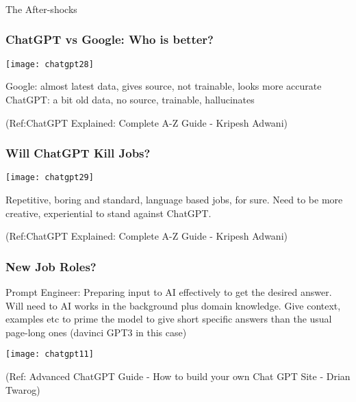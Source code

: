 \begin{frame}[fragile]\frametitle{}
\begin{center}
{\Large The After-shocks}
\end{center}
\end{frame}



\begin{frame}[fragile]\frametitle{ChatGPT vs Google: Who is better?}


\begin{center}
\texttt{[image: chatgpt28]}
\end{center}		

Google: almost latest data, gives source, not trainable, looks more accurate
ChatGPT: a bit old data, no source, trainable, hallucinates

\tiny{(Ref:ChatGPT Explained: Complete A-Z Guide - Kripesh Adwani)}
\end{frame}


\begin{frame}[fragile]\frametitle{Will ChatGPT Kill Jobs?}


\begin{center}
\texttt{[image: chatgpt29]}
\end{center}		

Repetitive, boring and standard, language based jobs, for sure.
Need to be more creative, experiential to stand against ChatGPT.

\tiny{(Ref:ChatGPT Explained: Complete A-Z Guide - Kripesh Adwani)}
\end{frame}


\begin{frame}[fragile]\frametitle{New Job Roles?}
Prompt Engineer: Preparing input to AI effectively to get the desired answer. Will need to AI works in the background plus domain knowledge. Give context, examples etc to prime the model to give short specific answers than the usual page-long ones (davinci GPT3 in this case)

			\begin{center}
			\texttt{[image: chatgpt11]}
			
			\end{center}		
			
			{\tiny (Ref: Advanced ChatGPT Guide - How to build your own Chat GPT Site - Drian Twarog)}
			

\end{frame}


